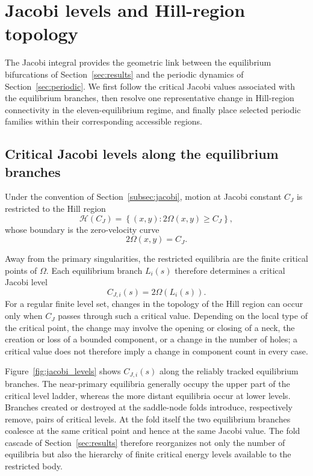 \section{Jacobi levels and Hill-region topology}
\label{sec:hill}

The Jacobi integral provides the geometric link between the equilibrium
bifurcations of Section~\ref{sec:results} and the periodic dynamics of
Section~\ref{sec:periodic}. We first follow the critical Jacobi values
associated with the equilibrium branches, then resolve one representative
change in Hill-region connectivity in the eleven-equilibrium regime, and
finally place selected periodic families within their corresponding
accessible regions.


\subsection{Critical Jacobi levels along the equilibrium branches}
\label{subsec:critical_jacobi}

Under the convention of Section~\ref{subsec:jacobi}, motion at Jacobi
constant $C_J$ is restricted to the Hill region
\begin{equation}
\mathcal H(C_J)
=
\left\{
(x,y):2\Omega(x,y)\geq C_J
\right\},
\label{eq:hill_region_results}
\end{equation}
whose boundary is the zero-velocity curve
\[
2\Omega(x,y)=C_J.
\]

Away from the primary singularities, the restricted equilibria are the
finite critical points of $\Omega$. Each equilibrium branch $L_i(s)$
therefore determines a critical Jacobi level
\begin{equation}
C_{J,i}(s)
=
2\Omega\!\left(L_i(s)\right).
\label{eq:critical_jacobi_branch}
\end{equation}
For a regular finite level set, changes in the topology of the Hill region
can occur only when $C_J$ passes through such a critical value. Depending
on the local type of the critical point, the change may involve the opening
or closing of a neck, the creation or loss of a bounded component, or a
change in the number of holes; a critical value does not therefore imply a
change in component count in every case.

Figure~\ref{fig:jacobi_levels} shows
$C_{J,i}(s)$ along the reliably tracked equilibrium branches. The
near-primary equilibria generally occupy the upper part of the critical
level ladder, whereas the more distant equilibria occur at lower levels.
Branches created or destroyed at the saddle-node folds introduce,
respectively remove, pairs of critical levels. At the fold itself the two
equilibrium branches coalesce at the same critical point and hence at the
same Jacobi value. The fold cascade of Section~\ref{sec:results} therefore
reorganizes not only the number of equilibria but also the hierarchy of
finite critical energy levels available to the restricted body.

